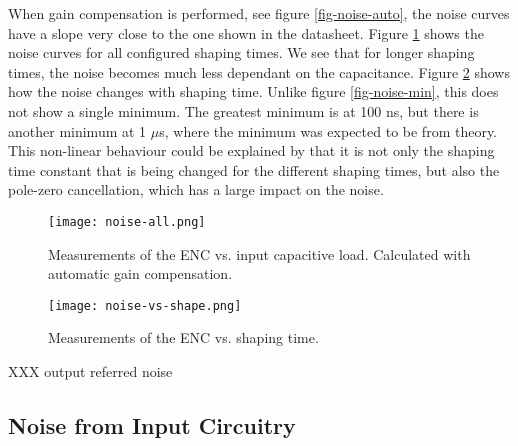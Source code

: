 \documentclass[../main/thesis.tex]{subfiles}
\begin{document}
When gain compensation is performed, see figure \ref{fig-noise-auto}, the noise curves have a slope very close to the one shown in the datasheet. Figure \ref{fig-noise-all} shows the noise curves for all configured shaping times. We see that for longer shaping times, the noise becomes much less dependant on the capacitance. Figure \ref{fig-noise-shape} shows how the noise changes with shaping time. Unlike figure \ref{fig-noise-min}, this does not show a single minimum. The greatest minimum is at 100 ns, but there is another minimum at 1 $\mu$s, where the minimum was expected to be from theory. This non-linear behaviour could be explained by that it is not only the shaping time constant that is being changed for the different shaping times, but also the pole-zero cancellation, which has a large impact on the noise. 

\begin{figure}[h] %
	\centering
	\texttt{[image: noise-all.png]}
	\caption{Measurements of the \gls{ENC} vs. input capacitive load. Calculated with automatic gain compensation.}
	\label{fig-noise-all}
\end{figure} 

\begin{figure}[h] %
	\centering
	\texttt{[image: noise-vs-shape.png]}
	\caption{Measurements of the \gls{ENC} vs. shaping time.}
	\label{fig-noise-shape}
\end{figure} 

XXX output referred noise

\newpage
\newpage
\subsection{Noise from Input Circuitry}
\label{ide-noise-input}
\end{document}
